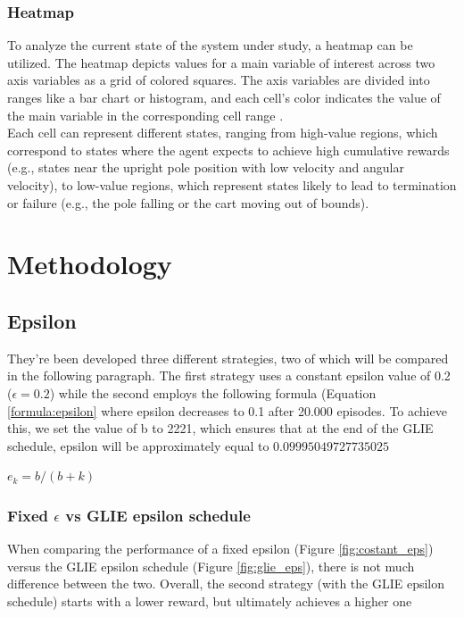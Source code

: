 \documentclass{article}
\begin{document}
\subsubsection{Heatmap}
To analyze the current state of the system under study, a heatmap can be utilized. The heatmap depicts values for a main variable of interest across two axis variables as a grid of colored squares. The axis variables are divided into ranges like a bar chart or histogram, and each cell’s color indicates the value of the main variable in the corresponding cell range \cite{heatmap}. \\ 

Each cell can represent different states, ranging from high-value regions, which correspond to states where the agent expects to achieve high cumulative rewards (e.g., states near the upright pole position with low velocity and angular velocity), to low-value regions, which represent states likely to lead to termination or failure (e.g., the pole falling or the cart moving out of bounds).


\section{Methodology}

\subsection{Epsilon}
They're been developed three different strategies, two of which will be compared in the following paragraph. The first strategy uses a constant epsilon value of 0.2  ($\epsilon =  0.2$) while the second employs the following formula (Equation \ref{formula:epsilon} where epsilon decreases to 0.1 after 20.000 episodes. To achieve this, we set the value of b to 2221, which ensures that at the end of the GLIE schedule, epsilon will be approximately equal to $0.09995049727735025$

\centering
\label{formula:epsilon}
$ e_k = b / (b+k) $ 

\flushleft

\subsubsection{Fixed $\epsilon$ vs GLIE epsilon schedule}
When comparing the performance of a fixed epsilon (Figure \ref{fig:costant_eps}) versus the GLIE epsilon schedule (Figure \ref{fig:glie_eps}), there is not much difference between the two. Overall, the second strategy (with the GLIE epsilon schedule) starts with a lower reward, but ultimately achieves a higher one
\end{document}
